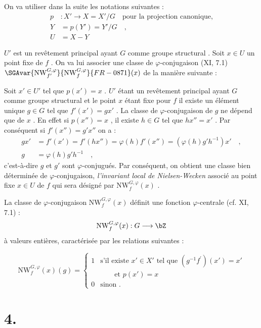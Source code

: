 On va utiliser dans la suite les notations suivantes :
\begin{align*}
p &: X' \longrightarrow X = X'/G \quad
\text{pour la projection canonique,} \\
Y &= p(Y') = Y'/G \quad , \\
U &= X - Y
\end{align*}

$U'$ est un revêtement principal ayant $G$ comme groupe structural . Soit $x \in U$ un point fixe de $f$ . On va lui associer une classe de $\varphi$-conjugaison (XI, 7.1) $\SGAvar{\mathrm{NW}_{f'}^{G,\varphi}}{\mathrm{NW}_{f}^{G,\varphi}}{FR-0871}(x)$ de la manière suivante :

Soit $x' \in U'$ tel que $p(x') = x$ . $U'$ étant un revêtement principal ayant $G$ comme groupe structural et le point $x$ étant fixe pour $f$ il existe un élément unique $g \in G$ tel que $f'(x') = gx'$ . La classe de $\varphi$-conjugaison de $g$ ne dépend que de $x$ . En effet si $p(x'') = x$ , il existe $h \in G$ tel que $hx'' = x'$ . Par conséquent si $f'(x'') = g'x''$ on a :
\begin{align*}
gx' &= f'(x') = f'(hx'') = \varphi(h)f'(x'') = (\varphi(h)g'h^{-1})x' \quad , \\
g &= \varphi(h)g'h^{-1} \quad ,
\end{align*}
c'est-à-dire $g$ et $g'$ sont $\varphi$-conjugués. Par conséquent, on obtient une classe bien déterminée de $\varphi$-conjugaison, \emph{l'invariant local de Nielsen-Wecken} associé au point fixe $x \in U$ de $f$ qui sera désigné par $\mathrm{NW}_{f}^{G,\varphi}(x)$ .

La classe de $\varphi$-conjugaison $\mathrm{NW}_{f}^{G,\varphi}(x)$ définit une fonction $\varphi$-centrale (cf. XI, 7.1) :
\[
\mathrm{NW}_{f}^{G,\varphi}(x) : G \longrightarrow \bZ
\]
à valeurs entières, caractérisée par les relations suivantes :

\begin{equation}\tag{3.1}
\mathrm{NW}_{f}^{G,\varphi}(x)(g) = \begin{cases} 1 &
\text{s'il existe } x' \in X' \text{ tel que } (g^{-1}f^{\prime})(x') = x' \\ & \qquad \text{et } p(x') = x \\ 0 & \text{sinon .} \end{cases}
\end{equation}

\section*{4.}

